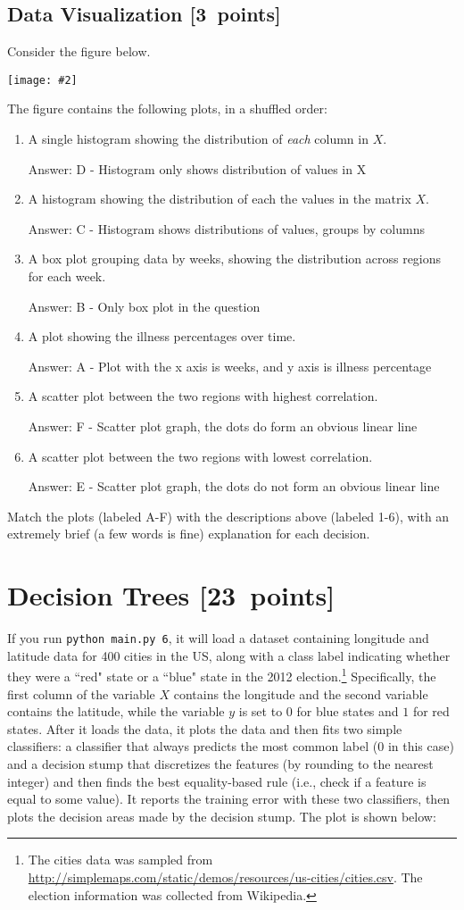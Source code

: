 \documentclass{article}
\newcommand{\blu}[1]{{\textcolor{blu}{#1}}}
\newcommand{\gre}[1]{\textcolor{gre}{#1}}
\newcommand\ans[1]{\par\gre{Answer: #1}}
\let\ask\blu
\newcommand\pts[1]{\textcolor{pointscolour}{[#1~points]}}
\newcommand{\centerfig}[2]{\begin{center}\texttt{[image: \#2]}\end{center}}
\begin{document}
  \subsection{Data Visualization \pts{3}}

  Consider the figure below.

  \centerfig{.9}{./figs/visualize-unlabeled}
  \newpage
  The figure contains the following plots, in a shuffled order:
  \begin{enumerate}
  \item A single histogram showing the distribution of \emph{each} column in $X$.
  \ans{D - Histogram only shows distribution of values in X}
  \item A histogram showing the distribution of each the values in the matrix $X$.
  \ans{C - Histogram shows distributions of values, groups by columns}
  \item A box plot grouping data by weeks, showing the distribution across regions for each week.
  \ans{B - Only box plot in the question}
  \item A plot showing the illness percentages over time.
  \ans{A - Plot with the x axis is weeks, and y axis is illness percentage}
  \item A scatter plot between the two regions with highest correlation.
  \ans{F - Scatter plot graph, the dots do form an obvious linear line}
  \item A scatter plot between the two regions with lowest correlation.
  \ans{E - Scatter plot graph, the dots do not form an obvious linear line}
  \end{enumerate}

  \ask{Match the plots (labeled A-F) with the descriptions above (labeled 1-6), with an extremely brief (a few words is fine) explanation for each decision.}
  \newpage

  \clearpage\section{Decision Trees \pts{23}}

  If you run \texttt{python main.py 6}, it will load a dataset containing longitude
  and latitude data for 400 cities in the US, along with a class label indicating
  whether they were a ``red" state or a ``blue" state in the 2012
  election.\footnote{The cities data was sampled from \url{http://simplemaps.com/static/demos/resources/us-cities/cities.csv}. The election information was collected from Wikipedia.}
  Specifically, the first column of the variable $X$ contains the
  longitude and the second variable contains the latitude,
  while the variable $y$ is set to $0$ for blue states and $1$ for red states.
  After it loads the data, it plots the data and then fits two simple
  classifiers: a classifier that always predicts the
  most common label ($0$ in this case) and a decision stump
  that discretizes the features (by rounding to the nearest integer)
  and then finds the best equality-based rule (i.e., check
  if a feature is equal to some value).
  It reports the training error with these two classifiers, then plots the decision areas made by the decision stump.
  The plot is shown below:
\end{document}
